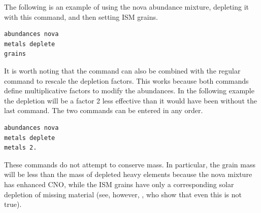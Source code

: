 The following is an example of using
the nova abundance mixture, depleting it with this command,
and then setting ISM grains.
\begin{verbatim}
abundances nova
metals deplete
grains
\end{verbatim}

It is worth noting that the  command can also
be combined with the regular  command to rescale the
depletion factors. This works because both commands define multiplicative
factors to modify the abundances. In the following example the depletion
will be a factor 2 less effective than it would have been without the last
command. The two  commands can be entered in any order.
\begin{verbatim}
abundances nova
metals deplete
metals 2.
\end{verbatim}

These commands do not attempt to conserve mass.
In particular, the grain
mass will be less than the mass of depleted heavy elements
because the nova
mixture has enhanced CNO, while the ISM grains have only
a corresponding
solar depletion of missing material
(see, however, \citealp{Snow1996}, who
show that even this is not true).








